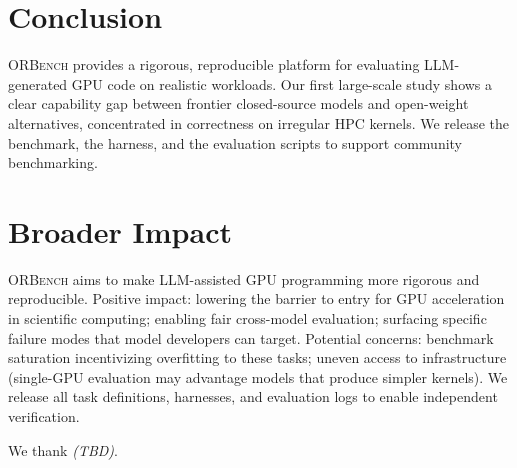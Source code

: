 \documentclass{article}
\begin{document}
\section{Conclusion}
\label{sec:conclusion}

\textsc{ORBench} provides a rigorous, reproducible platform for
evaluating LLM-generated GPU code on realistic workloads. Our first
large-scale study shows a clear capability gap between frontier
closed-source models and open-weight alternatives, concentrated in
correctness on irregular HPC kernels. We release the benchmark, the
harness, and the evaluation scripts to support community benchmarking.

\section*{Broader Impact}

\textsc{ORBench} aims to make LLM-assisted GPU programming more
rigorous and reproducible. Positive impact: lowering the barrier to
entry for GPU acceleration in scientific computing; enabling fair
cross-model evaluation; surfacing specific failure modes that model
developers can target. Potential concerns: benchmark saturation
incentivizing overfitting to these tasks; uneven access to
infrastructure (single-GPU evaluation may advantage models that
produce simpler kernels). We release all task definitions, harnesses,
and evaluation logs to enable independent verification.

\begin{ack}
We thank \emph{(TBD)}.
\end{ack}
\end{document}
